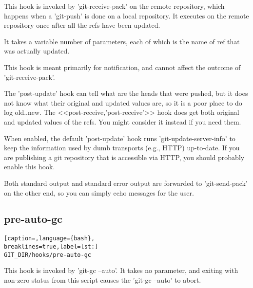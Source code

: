 This hook is invoked by 'git-receive-pack' on the remote repository, which
happens when a 'git-push' is done on a local repository. It executes on the
remote repository once after all the refs have been updated.

It takes a variable number of parameters, each of which is the name of ref that
was actually updated.

This hook is meant primarily for notification, and cannot affect the outcome of
'git-receive-pack'.

The 'post-update' hook can tell what are the heads that were pushed, but it
does not know what their original and updated values are, so it is a poor place
to do log old..new. The <<post-receive,'post-receive'>> hook does get both
original and updated values of the refs. You might consider it instead if you
need them.

When enabled, the default 'post-update' hook runs 'git-update-server-info' to
keep the information used by dumb transports (e.g., HTTP) up-to-date. If you
are publishing a git repository that is accessible via HTTP, you should
probably enable this hook.

Both standard output and standard error output are forwarded to 'git-send-pack'
on the other end, so you can simply echo messages for the user.

\subsection{pre-auto-gc}
\lstset{basicstyle=\scriptsize, numbers=none, captionpos=b, tabsize=4}
\begin{lstlisting}[caption=,language={bash},
breaklines=true,label=lst:]
GIT_DIR/hooks/pre-auto-gc
\end{lstlisting}

This hook is invoked by 'git-gc --auto'. It takes no parameter, and exiting
with non-zero status from this script causes the 'git-gc --auto' to abort.
